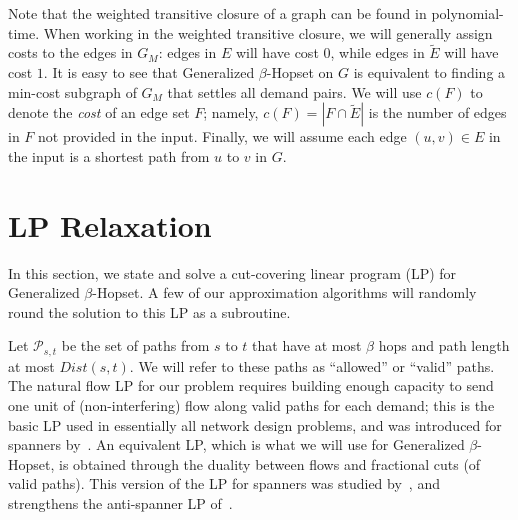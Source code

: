 \documentclass{article}
\theoremstyle{definition}
\theoremstyle{remark}
\def\hopset {{\sc Generalized $\beta$-Hopset}}
\begin{document}
Note that the weighted transitive closure of a graph can be found in polynomial-time. When working in the weighted transitive closure, we will generally assign costs to the edges in $G_M$: edges in $E$ will have cost $0$, while edges in $\widetilde{E}$ will have cost $1$. It is easy to see that {\hopset} on $G$ is equivalent to finding a min-cost subgraph of $G_M$ that settles all demand pairs. We will use $c(F)$ to denote the \textit{cost} of an edge set $F$; namely, $c(F) = |F \cap \widetilde{E}|$ is the number of edges in $F$ not provided in the input. 
Finally, we will assume each edge $(u,v) \in E$ in the input is a shortest path from $u$ to $v$ in $G$.




\section{LP Relaxation} \label{sec:lp_relaxation}



\begin{comment}
The natural relaxation of this problem is the following LP, where each edge in $E_M$ has a variable $x_e$ and cost $c_e=1$ if $e \in E$ or $c_e=0$ if $e \not \in E$. We also have a variable $f_P$ for every allowed path. The LP ensures that (integrally) for each pair of demands one hopbounded path with desired stretch is chosen. 
 
\begin{align} \label{lp:flow}
\min \quad &\sum_{e \in E_M}c_ex_e \nonumber\\
\text{s.t.} \quad &\sum_{P \in \mathcal{P}_{u,v}: e\in P} f_P\leq x_e  &\forall(u,v) \in  \mathcal{D}, \forall e \in E_M  \nonumber \\
&\sum_{P \in \mathcal{P}_{u,v}} f_P \geq 1 &\forall(u,v) \in  \mathcal{D}\\
&x_e \geq 0 &\forall	e \in E_M \nonumber \\
&f_P \geq 0 &\forall(u,v)\in  \mathcal{D}, \forall P\in \mathcal{P}_{u,v} \nonumber
\end{align}
\end{comment}

In this section, we state and solve a cut-covering linear program (LP) for {\hopset}. A few of our approximation algorithms will randomly round the solution to this LP as a subroutine. 

Let $\mathcal{P}_{s,t}$ be the set of paths from $s$ to $t$ that have at most $\beta$ hops and path length at most $Dist(s,t)$. We will refer to these paths as ``allowed'' or ``valid'' paths. The natural flow LP for our problem requires building enough capacity to send one unit of (non-interfering) flow along valid paths for each demand; this is the basic LP used in essentially all network design problems, and was introduced for spanners by~\cite{DK11}.  An equivalent LP, which is what we will use for {\hopset}, is obtained through the duality between flows and fractional cuts (of valid paths).  This version of the LP for spanners was studied by~\cite{DNZ20}, and strengthens the anti-spanner LP of~\cite{BBMRY11}. 
\end{document}
